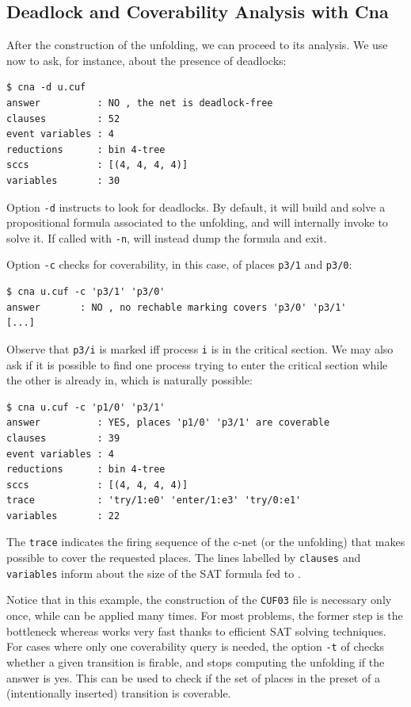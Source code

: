 \documentclass[a4paper]{refart}
\begin{document}
\subsection{Deadlock and Coverability Analysis with Cna}%
\label{s:deadlock}

After the construction of the unfolding, we can proceed to its analysis.
We use now \cna{} to ask, for instance, about the presence of deadlocks:
\begin{verbatim}
$ cna -d u.cuf
answer          : NO , the net is deadlock-free
clauses         : 52
event variables : 4
reductions      : bin 4-tree
sccs            : [(4, 4, 4, 4)]
variables       : 30
\end{verbatim}
Option \verb!-d! instructs \cna{} to look for deadlocks.
By default, it will build and solve a propositional formula associated to the
unfolding, and will internally invoke \minisat to solve it.
If called with \verb!-n!, \cna will instead dump the formula and exit.

Option \verb!-c! checks for coverability, in this case, of places
\verb!p3/1! and \verb!p3/0!:
\begin{verbatim}
$ cna u.cuf -c 'p3/1' 'p3/0'
answer       : NO , no rechable marking covers 'p3/0' 'p3/1'
[...]
\end{verbatim}
Observe that \verb!p3/i! is marked iff process \verb!i! is in the critical
section.
We may also ask if it is possible to find one process trying to enter the
critical section while the other is already in, which is naturally possible:
\begin{verbatim}
$ cna u.cuf -c 'p1/0' 'p3/1'
answer          : YES, places 'p1/0' 'p3/1' are coverable
clauses         : 39
event variables : 4
reductions      : bin 4-tree
sccs            : [(4, 4, 4, 4)]
trace           : 'try/1:e0' 'enter/1:e3' 'try/0:e1'
variables       : 22
\end{verbatim}

The \verb!trace! indicates the firing sequence of the c-net (or the unfolding)
that makes possible to cover the requested places.
The lines labelled by \verb!clauses! and \verb!variables! inform about the
size of the SAT formula fed to \minisat.

Notice that in this example, the construction of the \verb!CUF03! file
is necessary only once, while \cna can be applied many times. For most
problems, the former step is the bottleneck whereas \cna works very fast
thanks to efficient SAT solving techniques. For cases where only one
coverability query is needed,
the option \verb!-t! of \cunf checks whether a given transition is
firable, and stops computing the unfolding if the answer is yes.
This can be used to check if the set of places in the preset of
a (intentionally inserted) transition is coverable.
\end{document}
